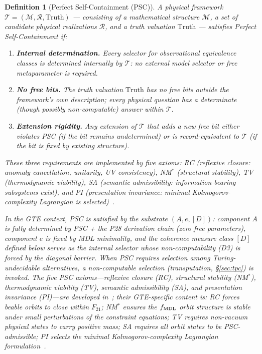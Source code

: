 \documentclass[12pt,letterpaper]{article}
\newtheorem{definition}[theorem]{Definition}
\newcommand{\Dclass}{[D]}
\begin{document}
\begin{definition}[Perfect Self-Containment (PSC)]\label{def:psc}
A physical framework $\mathcal{T} = (\mathcal{M}, \mathcal{R}, \mathrm{Truth})$ ---
consisting of a mathematical structure $\mathcal{M}$, a set of candidate physical
realizations $\mathcal{R}$, and a truth valuation $\mathrm{Truth}$ ---
satisfies \emph{Perfect Self-Containment} if:
\begin{enumerate}[label=(\roman*),itemsep=2pt]
  \item \textbf{Internal determination.}  Every selector for observational
    equivalence classes is determined internally by $\mathcal{T}$: no external model
    selector or free metaparameter is required.
  \item \textbf{No free bits.}  The truth valuation $\mathrm{Truth}$ has no free bits
    outside the framework's own description; every physical question has a
    determinate (though possibly non-computable) answer within $\mathcal{T}$.
  \item \textbf{Extension rigidity.}  Any extension of $\mathcal{T}$ that adds a new
    free bit either violates PSC (if the bit remains undetermined) or is
    record-equivalent to $\mathcal{T}$ (if the bit is fixed by existing structure).
\end{enumerate}
These three requirements are implemented by five axioms: RC (reflexive closure:
anomaly cancellation, unitarity, UV consistency), NM$^*$ (structural stability),
TV (thermodynamic viability), SA (semantic admissibility: information-bearing
subsystems exist), and PI (presentation invariance: minimal Kolmogorov-complexity
Lagrangian is selected)~\cite{SpivackNEMS05}.

In the GTE context, PSC is satisfied by the substrate $(A, e, \Dclass)$:
component $A$ is fully determined by PSC + the P28 derivation chain (zero free
parameters), component $e$ is fixed by MDL minimality, and the coherence measure
class $\Dclass$ defined below serves as the internal selector whose non-computability
(D3) is forced by the diagonal barrier.
When PSC requires selection among Turing-undecidable alternatives, a non-computable
selection (transputation, \S\ref{sec:tpc}) is invoked.
The five PSC axioms---reflexive closure (RC), structural stability (NM$^*$),
thermodynamic viability (TV), semantic admissibility (SA), and presentation invariance (PI)---are
developed in~\cite{SpivackNEMS05,SpivackNEMS10}; their GTE-specific content is:
RC forces beable orbits to close within $F_{21}$; NM$^*$ ensures the $f_{\rm MDL}$ orbit structure is stable under small perturbations of the constraint equations;
TV requires non-vacuum physical states to carry positive mass;
SA requires all orbit states to be PSC-admissible; PI selects the
minimal Kolmogorov-complexity Lagrangian formulation~\cite{SpivackNEMS10,SpivackNEMS11,SpivackBornRule}.
\end{definition}
\end{document}
